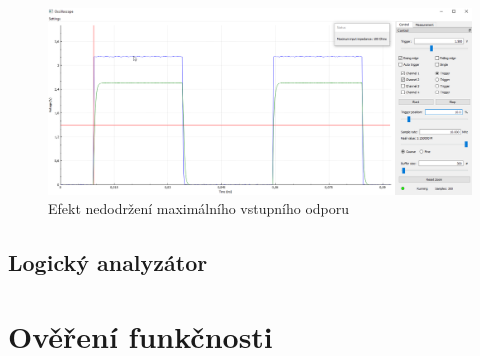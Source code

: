\begin{figure}[H]
	\centering
	\includegraphics[width=0.9\linewidth]{Figs/Graphs/WrongMaxRAIN}
	\caption{Efekt nedodržení maximálního vstupního odporu}
	\label{fig:wrongmaxrain}
\end{figure}


\section{Logický analyzátor}
\chapter{Ověření funkčnosti}



